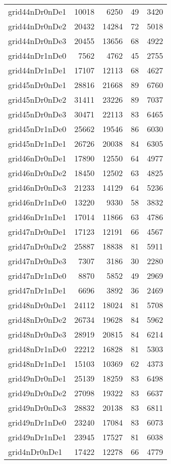 \begin{longtable}{lrrrr}
grid44nDr0nDe1 & 10018 & 6250 & 49 & 3420 \\
grid44nDr0nDe2 & 20432 & 14284 & 72 & 5018 \\
grid44nDr0nDe3 & 20455 & 13656 & 68 & 4922 \\
grid44nDr1nDe0 & 7562 & 4762 & 45 & 2755 \\
grid44nDr1nDe1 & 17107 & 12113 & 68 & 4627 \\
grid45nDr0nDe1 & 28816 & 21668 & 89 & 6760 \\
grid45nDr0nDe2 & 31411 & 23226 & 89 & 7037 \\
grid45nDr0nDe3 & 30471 & 22113 & 83 & 6465 \\
grid45nDr1nDe0 & 25662 & 19546 & 86 & 6030 \\
grid45nDr1nDe1 & 26726 & 20038 & 84 & 6305 \\
grid46nDr0nDe1 & 17890 & 12550 & 64 & 4977 \\
grid46nDr0nDe2 & 18450 & 12502 & 63 & 4825 \\
grid46nDr0nDe3 & 21233 & 14129 & 64 & 5236 \\
grid46nDr1nDe0 & 13220 & 9330 & 58 & 3832 \\
grid46nDr1nDe1 & 17014 & 11866 & 63 & 4786 \\
grid47nDr0nDe1 & 17123 & 12191 & 66 & 4567 \\
grid47nDr0nDe2 & 25887 & 18838 & 81 & 5911 \\
grid47nDr0nDe3 & 7307 & 3186 & 30 & 2280 \\
grid47nDr1nDe0 & 8870 & 5852 & 49 & 2969 \\
grid47nDr1nDe1 & 6696 & 3892 & 36 & 2469 \\
grid48nDr0nDe1 & 24112 & 18024 & 81 & 5708 \\
grid48nDr0nDe2 & 26734 & 19628 & 84 & 5962 \\
grid48nDr0nDe3 & 28919 & 20815 & 84 & 6214 \\
grid48nDr1nDe0 & 22212 & 16828 & 81 & 5303 \\
grid48nDr1nDe1 & 15103 & 10369 & 62 & 4373 \\
grid49nDr0nDe1 & 25139 & 18259 & 83 & 6498 \\
grid49nDr0nDe2 & 27098 & 19322 & 83 & 6637 \\
grid49nDr0nDe3 & 28832 & 20138 & 83 & 6811 \\
grid49nDr1nDe0 & 23240 & 17084 & 83 & 6073 \\
grid49nDr1nDe1 & 23945 & 17527 & 81 & 6038 \\
grid4nDr0nDe1 & 17422 & 12278 & 66 & 4779 \\

\end{longtable}

